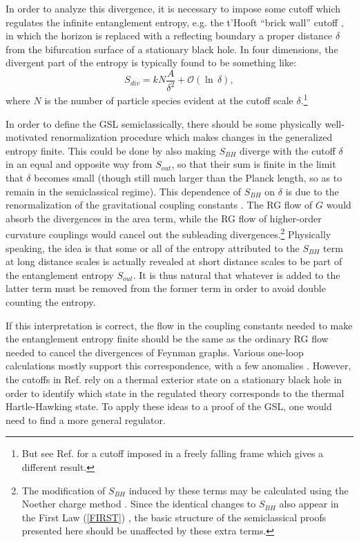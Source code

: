 \documentclass[12pt]{article}
\begin{document}
In order to analyze this divergence, it is necessary to impose some cutoff which regulates the infinite entanglement entropy, e.g. the t'Hooft ``brick wall'' cutoff \cite{thooft85}, in which the horizon is replaced with a reflecting boundary a proper distance $\delta$ from the bifurcation surface of a stationary black hole.  In four dimensions, the divergent part of the entropy is typically found to be something like:
\begin{equation}
S_{div} = kN\frac{A}{\delta^2} + \mathcal{O}(\ln\,\delta),
\end{equation}
where $N$ is the number of particle species evident at the cutoff scale $\delta$.\footnote{But see Ref. \cite{JP07} for a cutoff imposed in a freely falling frame which gives a different result.}

In order to define the GSL semiclassically, there should be some physically well-motivated renormalization procedure which makes changes in the generalized entropy finite.  This could be done by also making $S_{BH}$ diverge with the cutoff $\delta$ in an equal and opposite way from $S_{out}$, so that their sum is finite in the limit that $\delta$ becomes small (though still much larger than the Planck length, so as to remain in the semiclassical regime).  This dependence of $S_{BH}$ on $\delta$ is due to the renormalization of the gravitational coupling constants \cite{jacobson94}.  The RG flow of $G$ would absorb the divergences in the area term, while the RG flow of higher-order curvature couplings would cancel out the subleading divergences.\footnote{The modification of $S_{BH}$ induced by these terms may be calculated using the Noether charge method \cite{wald93}.  Since the identical changes to $S_{BH}$ also appear in the First Law (\ref{FIRST}) \cite{JKM95}, the basic structure of the semiclassical proofs presented here should be unaffected by these extra terms.}  Physically speaking, the idea is that some or all of the entropy attributed to the $S_{BH}$ term at long distance scales is actually revealed at short distance scales to be part of the entanglement entropy $S_{out}$.  It is thus natural that whatever is added to the latter term must be removed from the former term in order to avoid double counting the entropy.

If this interpretation is correct, the flow in the coupling constants needed to make the entanglement entropy finite should be the same as the ordinary RG flow needed to cancel the divergences of Feynman graphs.  Various one-loop calculations mostly support this correspondence, with a few anomalies \cite{FS94}.  However, the cutoffs in Ref. \cite{FS94} rely on a thermal exterior state on a stationary black hole in order to identify which state in the regulated theory corresponds to the thermal Hartle-Hawking state.  To apply these ideas to a proof of the GSL, one would need to find a more general regulator.
\end{document}
